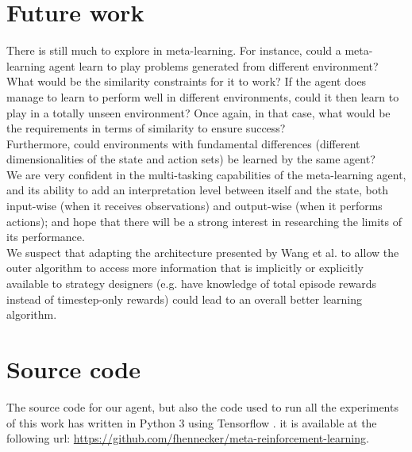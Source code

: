 \section{Future work}
There is still much to explore in meta-learning. For instance, could a 
meta-learning agent learn to play problems generated from different environment?
What would be the similarity constraints for it to work? If the agent does
manage to learn to perform well in different environments, could it then
learn to play in a totally unseen environment? Once again, in that case,
what would be the requirements in terms of similarity to ensure success?\\

Furthermore, could environments with fundamental differences (different 
dimensionalities of the state and action sets) be learned by the same agent?\\

We are very confident in the multi-tasking capabilities of the meta-learning
agent, and its ability to add an interpretation level between itself and the 
state, both input-wise (when it receives observations) and output-wise (when
it performs actions); and hope that there will be a strong interest in 
researching the limits of its performance.\\

We suspect that adapting the architecture presented by Wang et al. to allow
the outer algorithm to access more information that is implicitly or
explicitly available to strategy designers (e.g. have knowledge of total 
episode rewards instead of timestep-only rewards) could lead to an overall 
better learning algorithm.\\


\section{Source code}
The source code for our agent, but also the code used to run all the
experiments of this work has written in Python 3 \cite{python3} using
Tensorflow \cite{tensorflow}. it is available at the following url:
\url{https://github.com/fhennecker/meta-reinforcement-learning}.
